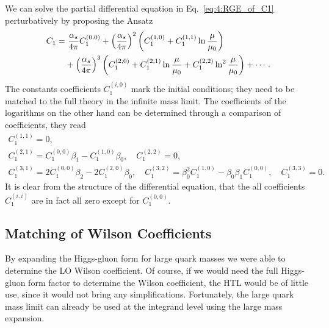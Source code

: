 We can solve the partial differential equation in Eq.~\eqref{eq:4:RGE_of_C1} perturbatively by proposing the Ansatz
\begin{equation}
\begin{split}
C_1 =  &\ \frac{\alpha_s}{4 \pi} C_1^{(0,0)} + \left(\frac{\alpha_s}{4 \pi} \right)^2 \left(C_1^{(1,0)} + C_1^{(1, 1)} \ln \frac{\mu}{\mu_0} \right) \\
&+ \left(\frac{\alpha_s}{4 \pi} \right)^3 \left(C_1^{(2, 0)} + C_1^{(2, 1)} \ln \frac{\mu}{\mu_0} + C_1^{(2, 2)} \ln^2 \frac{\mu}{\mu_0} \right) + \cdots.
\end{split}
\end{equation}
The constants coefficients $C_1^{(i, 0)}$ mark the initial conditions; they need to be matched to the full theory in the infinite mass limit. The coefficients of the logarithms on the other hand can be determined through a comparison of coefficients, they read
\begin{equation}
\begin{gathered}
C_1^{(1,1)} = 0, \\
C_1^{(2,1)} = C_1^{(0,0)} \beta_1 - C_1^{(1, 0)} \beta_0, \quad C_1^{(2, 2)} = 0, \\
C_1^{(3,1)} = 2 C_1^{(0,0)} \beta_2 - 2 C_1^{(2,0)} \beta_0, \quad C_1^{(3,2)} = \beta_0^2 C_1^{(1,0)} - \beta_0 \beta_1 C_1^{(0,0)}, \quad C_1^{(3, 3)} = 0.
\end{gathered}
\end{equation}
It is clear from the structure of the differential equation, that the all coefficients $C_1^{(i, i)}$ are in fact all zero except for $C_1^{(0,0)}$.

\subsection{Matching of Wilson Coefficients}
By expanding the Higgs-gluon form for large quark masses we were able to determine the \acs{LO} Wilson coefficient. Of course, if we would need the full Higgs-gluon form factor to determine the Wilson coefficient, the \acs{HTL} would be of little use, since it would not bring any simplifications. Fortunately, the large quark mass limit can already be used at the integrand level using the large mass expansion.

